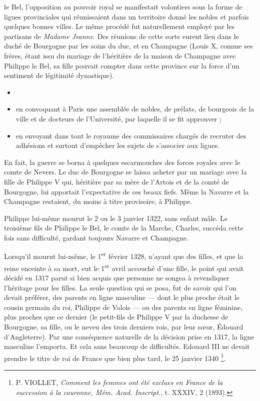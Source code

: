 \documentclass[french,twoside]{book} %
\begin{document}
\label{p13} le Bel, l’opposition au pouvoir royal se manifestait volontiers sous la forme de ligues provinciales qui réunissaient dans un territoire donné les nobles et parfois quelques bonnes villes. Le même procédé fut naturellement employé par les partisans de \emph{Madame Jeanne}. Des réunions de cette sorte eurent lieu dans le duché de Bourgogne par les soins du duc, et en Champagne (Louis X, comme ses frères, étant issu du mariage de l’héritière de la maison de Champagne avec Philippe le Bel, sa fille pouvait compter dans cette province sur la force d’un sentiment de légitimité dynastique).\par

\begin{itemize}[itemsep=0pt,]
\item[] \hspace{-1.5em}{\bfseries Par ailleurs, Philippe fit appel à l’opinion :}
\item en convoquant à Paris une assemblée de nobles, de prélats, de bourgeois de la ville et de docteurs de l’Université, par laquelle il se fit approuver ;
\item en envoyant dans tout le royaume des commissaires chargés de recruter des adhésions et surtout d’empêcher les sujets de s’associer aux ligues.
\end{itemize}
\noindent En fait, la guerre se borna à quelques escarmouches des forces royales avec le comte de Nevers. Le duc de Bourgogne se laissa acheter par un mariage avec la fille de Philippe V qui, héritière par sa mère de l’Artois et de la comté de Bourgogne, lui apportait l’expectative de ces beaux fiefs. Même la Navarre et la Champagne restaient, du moins à titre provisoire, à Philippe.\par
Philippe lui-même mourut le 2 ou le 3 janvier 1322, sans enfant mâle. Le troisième fils de Philippe le Bel, le comte de la Marche, Charles, succéda cette fois sans difficulté, gardant toujours Navarre et Champagne.\par
Lorsqu’il mourut lui-même, le 1\textsuperscript{er} février 1328, n’ayant que des filles, et que la reine enceinte à sa mort, eut le 1­\textsuperscript{er} avril accouché d’une fille, le point qui avait décidé en 1317 parut si bien acquis que personne ne songea à revendiquer l’héritage pour les filles. La seule question qui se posa, fut de savoir qui l’on devait préférer, des parents en ligne masculine — dont le plus proche était le cousin germain du roi, Philippe de Valois — ou des parents en ligne féminine, plus proches que ce dernier (le petit-fils de Philippe V par la duchesse de Bourgogne, sa fille, ou le neveu des trois derniers rois, par leur sœur, Édouard d’Angleterre). Par une conséquence naturelle de la décision prise en 1317, la ligne masculine l’emporta. Et cela sans beaucoup de difficultés. Edouard III ne devait prendre le titre de roi de France que bien plus tard, le 25 janvier 1340 \footnote{ P. VIOLLET, {\itshape Comment les femmes ont été exclues en France de la succession à la couronne, Mém. Acad. Inscript}., t. XXXIV, 2 (1893).}.\par
\end{document}
